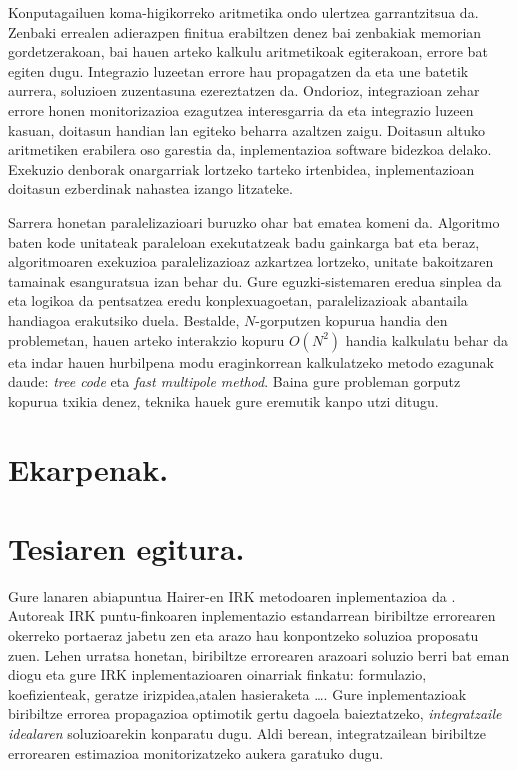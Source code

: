 Konputagailuen koma-higikorreko aritmetika ondo ulertzea garrantzitsua da. Zenbaki errealen adierazpen finitua erabiltzen denez bai zenbakiak memorian gordetzerakoan, bai hauen arteko kalkulu aritmetikoak egiterakoan, errore bat egiten dugu. Integrazio luzeetan errore hau propagatzen da eta une batetik aurrera, soluzioen zuzentasuna ezereztatzen da. Ondorioz, integrazioan zehar errore honen monitorizazioa ezagutzea interesgarria da eta integrazio luzeen kasuan, doitasun handian lan egiteko beharra azaltzen zaigu. Doitasun altuko aritmetiken erabilera oso garestia da, inplementazioa software bidezkoa delako. Exekuzio denborak onargarriak lortzeko tarteko irtenbidea, inplementazioan doitasun ezberdinak nahastea izango litzateke.       

Sarrera honetan paralelizazioari buruzko ohar bat ematea komeni da. Algoritmo baten kode unitateak paraleloan exekutatzeak badu gainkarga bat eta beraz,  algoritmoaren exekuzioa paralelizazioaz azkartzea lortzeko,  unitate bakoitzaren tamainak esanguratsua izan behar du. Gure eguzki-sistemaren eredua sinplea da eta logikoa da pentsatzea eredu konplexuagoetan, paralelizazioak abantaila handiagoa erakutsiko duela. Bestalde, $N$-gorputzen kopurua handia den problemetan, hauen arteko interakzio kopuru $O(N^2)$ handia kalkulatu behar da eta indar hauen hurbilpena modu eraginkorrean kalkulatzeko metodo ezagunak daude: \textit {tree code}\cite{Barnes1986} eta \textit {fast multipole method}\cite{Carrier1988}. Baina gure probleman gorputz kopurua txikia denez, teknika hauek gure eremutik kanpo utzi ditugu. 


\section{Ekarpenak.}

\section{Tesiaren egitura.}

Gure lanaren abiapuntua Hairer-en IRK metodoaren inplementazioa da \cite{Hairer2008}. Autoreak IRK puntu-finkoaren inplementazio estandarrean biribiltze errorearen okerreko portaeraz jabetu zen eta arazo hau konpontzeko soluzioa proposatu zuen. Lehen urratsa honetan, biribiltze errorearen arazoari soluzio berri bat eman diogu eta gure IRK inplementazioaren oinarriak finkatu: formulazio, koefizienteak, geratze irizpidea,atalen hasieraketa \dots.
Gure inplementazioak biribiltze errorea propagazioa optimotik gertu dagoela baieztatzeko, \emph{integratzaile idealaren} soluzioarekin konparatu dugu. Aldi berean, integratzailean biribiltze errorearen estimazioa monitorizatzeko aukera garatuko dugu.

